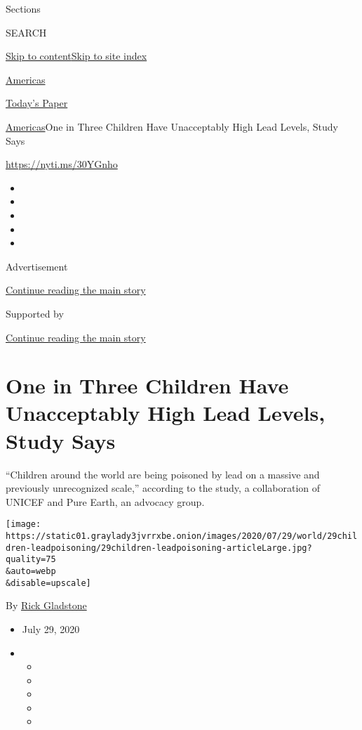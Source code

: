 Sections

SEARCH

\protect\hyperlink{site-content}{Skip to
content}\protect\hyperlink{site-index}{Skip to site index}

\href{https://www.nytimes3xbfgragh.onion/section/world/americas}{Americas}

\href{https://myaccount.nytimes3xbfgragh.onion/auth/login?response_type=cookie\&client_id=vi}{}

\href{https://www.nytimes3xbfgragh.onion/section/todayspaper}{Today's
Paper}

\href{/section/world/americas}{Americas}\textbar{}One in Three Children
Have Unacceptably High Lead Levels, Study Says

\url{https://nyti.ms/30YGnho}

\begin{itemize}
\item
\item
\item
\item
\item
\end{itemize}

Advertisement

\protect\hyperlink{after-top}{Continue reading the main story}

Supported by

\protect\hyperlink{after-sponsor}{Continue reading the main story}

\hypertarget{one-in-three-children-have-unacceptably-high-lead-levels-study-says}{%
\section{One in Three Children Have Unacceptably High Lead Levels, Study
Says}\label{one-in-three-children-have-unacceptably-high-lead-levels-study-says}}

``Children around the world are being poisoned by lead on a massive and
previously unrecognized scale,'' according to the study, a collaboration
of UNICEF and Pure Earth, an advocacy group.

\texttt{[image: https://static01.graylady3jvrrxbe.onion/images/2020/07/29/world/29children-leadpoisoning/29children-leadpoisoning-articleLarge.jpg?quality=75\\\&auto=webp\\\&disable=upscale]}

By \href{https://www.nytimes3xbfgragh.onion/by/rick-gladstone}{Rick
Gladstone}

\begin{itemize}
\item
  July 29, 2020
\item
  \begin{itemize}
  \item
  \item
  \item
  \item
  \item
  \end{itemize}
\end{itemize}

